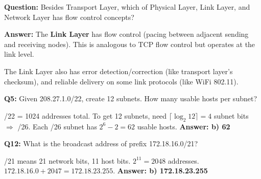 \begin{exambox}
\textbf{Question:} Besides Transport Layer, which of Physical Layer, Link Layer, and Network Layer has flow control concepts?

\textbf{Answer:} The \textbf{Link Layer} has flow control (pacing between adjacent sending and receiving nodes). This is analogous to TCP flow control but operates at the link level.

\medskip
The Link Layer also has error detection/correction (like transport layer's checksum), and reliable delivery on some link protocols (like WiFi 802.11).
\end{exambox}

\begin{exambox}
\textbf{Q5:} Given 208.27.1.0/22, create 12 subnets. How many usable hosts per subnet?

/22 = 1024 addresses total. To get 12 subnets, need $\lceil\log_2 12\rceil = 4$ subnet bits $\Rightarrow$ /26.
Each /26 subnet has $2^6 - 2 = 62$ usable hosts. \textbf{Answer: b) 62}

\medskip
\textbf{Q12:} What is the broadcast address of prefix 172.18.16.0/21?

/21 means 21 network bits, 11 host bits. $2^{11} = 2048$ addresses.
$172.18.16.0 + 2047 = 172.18.23.255$. \textbf{Answer: b) 172.18.23.255}
\end{exambox}
